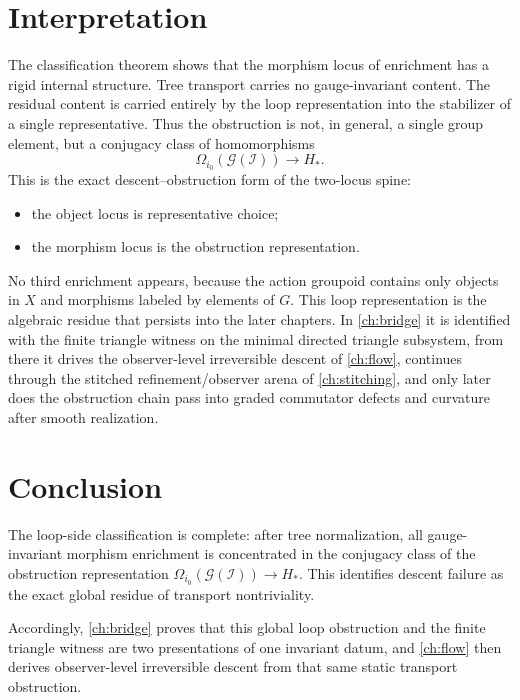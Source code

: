 \section{Interpretation}
The classification theorem shows that the morphism locus of enrichment
has a rigid internal structure.
Tree transport carries no gauge-invariant content.
The residual content is carried entirely by the loop representation into
the stabilizer of a single representative. Thus the obstruction is not,
in general, a single group element, but a conjugacy class of
homomorphisms
\[
	\Omega_{i_0}(\mathcal G(\mathcal I))\to H_*.
\]
This is the exact descent--obstruction form of the two-locus spine:
\begin{itemize}
	\item the object locus is representative choice;
	\item the morphism locus is the obstruction representation.
\end{itemize}
No third enrichment appears, because the action groupoid contains only
objects in \(X\) and morphisms labeled by elements of \(G\).
This loop representation is the algebraic residue that persists into the
later chapters. In \cref{ch:bridge} it is identified with the finite
triangle witness on the minimal directed triangle subsystem, from there
it drives the observer-level irreversible descent of \cref{ch:flow},
continues through the stitched refinement/observer arena of
\cref{ch:stitching}, and only later does the obstruction chain pass
into graded commutator defects and curvature after smooth
realization.

\section{Conclusion}
\label{sec:descent-obstruction-conclusion}
The loop-side classification is complete: after tree normalization, all
gauge-invariant morphism enrichment is concentrated in the conjugacy class
of the obstruction representation
\(\Omega_{i_0}(\mathcal G(\mathcal I))\to H_*\).
This identifies descent failure as the exact global residue of transport
nontriviality.

Accordingly, \cref{ch:bridge} proves that this global loop
obstruction and the finite triangle witness are two presentations of
one invariant datum, and \cref{ch:flow} then derives observer-level
irreversible descent from that same static transport obstruction.

\begin{chapterclosing}
\end{chapterclosing}
